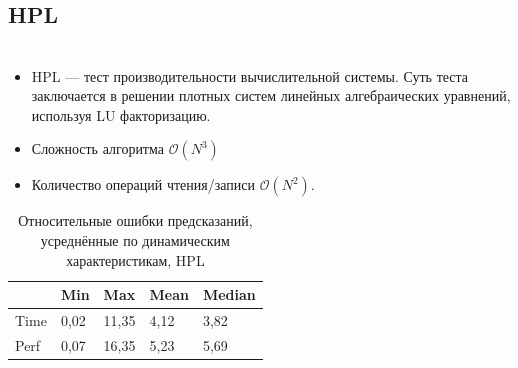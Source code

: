 \documentclass[unicode, t, 11pt]{beamer}%
\newlength{\mylen}
\begin{document}

		\subsection{HPL}
		\begin{frame}
			\footnotesize
			\frametitle{\insertsection}
	 		\framesubtitle{\insertsubsection}
	 		\begin{columns}[T]
	 			\setlength{\mylen}{0.45\textwidth}
	 			\begin{column}{\mylen}
	 				\begin{itemize}[label = \(\bullet\)]
				 		\item HPL — тест производительности вычислительной системы.
				 		Суть теста заключается в решении плотных систем линейных алгебраических уравнений, используя LU факторизацию.
				 		\item Сложность алгоритма \(\mathcal{O}(N^3)\)
				 		\item Количество операций чтения/записи \(\mathcal{O}(N^2)\).
				 	\end{itemize}
				 	\begin{table}
			 			\captionsetup{font=tiny, labelfont=tiny}
			 			\tiny
							\begin{tabularx}{\textwidth}{|X|X|X|X|X|}%
								\hline
								     & Min  & Max   & Mean & Median \\ \hline
								Time & 0,02 & 11,35 & 4,12 & 3,82   \\ \hline
								Perf & 0,07 & 16,35 & 5,23 & 5,69   \\ \hline
							\end{tabularx}
						\caption{Относительные ошибки предсказаний, усреднённые по динамическим характеристикам, HPL}
					\end{table}
				 			

\end{column}
\end{columns}
\end{frame}
\end{document}
